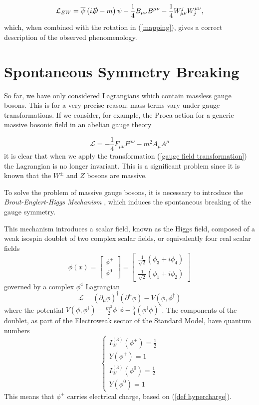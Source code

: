 \documentclass[10pt,a4paper]{book}
\begin{document}
\begin{equation}
\label{EW lagrangian}
\mathcal{L}_{EW} = \overline{\psi}\left(i\slashed{D} - m\right)\psi - \frac{1}{4}B_{\mu\nu}B^{\mu\nu} - \frac{1}{4}W^j_{\mu\nu}W_j^{\mu\nu},
\end{equation}
which, when combined with the rotation in (\ref{mapping}), gives a correct description of the observed phenomenology.
\section{Spontaneous Symmetry Breaking}

So far, we have only considered Lagrangians which contain massless gauge bosons. This is for a very precise reason: mass terms vary under gauge transformations. If we consider, for example, the Proca action for a generic massive bosonic field in an abelian gauge theory

\begin{equation}
\mathcal{L} = -\frac{1}{4}F_{\mu\nu}F^{\mu\nu} - m^2 A_\mu A^\mu
\end{equation}
it is clear that when we apply the transformation (\ref{gauge field transformation}) the Lagrangian is no longer invariant. This is a significant problem since it is known that the $W^\pm$ and $Z$ bosons are massive.

To solve the problem of massive gauge bosons, it is necessary to introduce the \emph{Brout-Englert-Higgs Mechanism} \cite{PhysRevLett.13.508, PhysRevLett.19.1264}, which induces the spontaneous breaking of the gauge symmetry. 

This mechanism introduces a scalar field, known as the Higgs field, composed of a weak isospin doublet of two complex scalar fields, or equivalently four real scalar fields
\begin{equation}
\phi(x) = 
\begin{bmatrix}
\phi^+ \\
\phi^0
\end{bmatrix} =
\begin{bmatrix}
\frac{1}{\sqrt{2}}(\phi_3 + i\phi_4) \\
\frac{1}{\sqrt{2}}(\phi_1 + i\phi_2)
\end{bmatrix}
\end{equation} governed by a complex $\phi^4$ Lagrangian 
\begin{equation}
\label{SSB lagrangian}
\mathcal{L} = (\partial_\mu\phi)^\dagger(\partial^\mu\phi) - V(\phi, \phi^\dagger)
\end{equation}
where the potential $V(\phi, \phi^\dagger) = \frac{m^2}{2}\phi^\dagger \phi - \frac{\lambda}{4}(\phi^\dagger\phi)^2$. The components of the doublet, as part of the Electroweak sector of the Standard Model, have quantum numbers 
\begin{equation}
\begin{cases}
I_W^{(3)}(\phi^+) = \frac{1}{2} \\
Y(\phi^+) = 1 \\
I_W^{(3)}(\phi^0) = \frac{1}{2} \\
Y(\phi^0) = 1
\end{cases}
\end{equation}
This means that $\phi^+$ carries electrical charge, based on (\ref{def hypercharge}).
\end{document}
